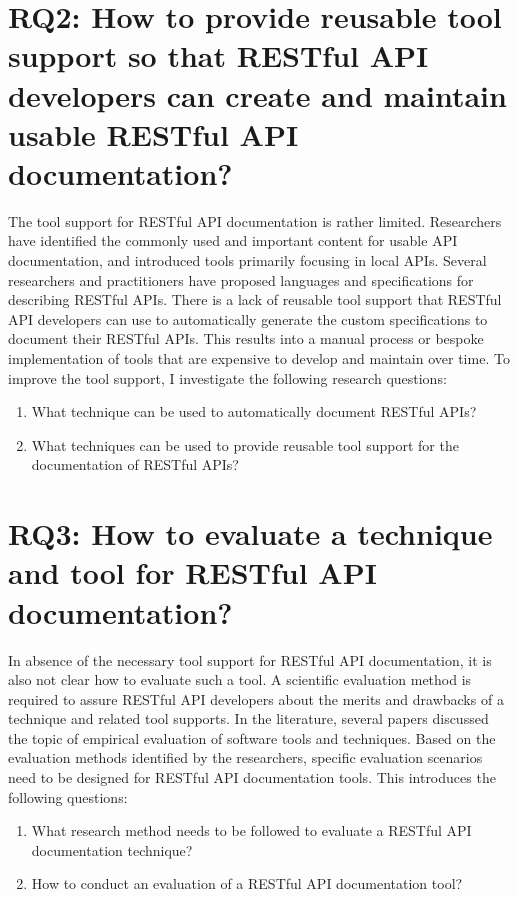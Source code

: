 \documentclass[11pt,oneside]{book}
\begin{document}
\section{RQ2: How to provide reusable tool support so that RESTful API developers can create and maintain usable RESTful API documentation?
} %

The tool support for RESTful API documentation is rather limited. Researchers have identified the commonly used and important content for usable API documentation, and introduced tools primarily focusing in local APIs. Several researchers and practitioners have proposed languages and specifications for describing RESTful APIs. There is a lack of reusable tool support that RESTful API developers can use to automatically generate the custom specifications to document their RESTful APIs. This results into a manual process or bespoke implementation of tools that are expensive to develop and maintain over time. To improve the tool support, I investigate the following research questions:

\begin{enumerate}
  \item What technique can be used to automatically document RESTful APIs?
  \item What techniques can be used to provide reusable tool support for the documentation of RESTful APIs?
\end{enumerate}

\section{RQ3: How to evaluate a technique and tool for RESTful API documentation?}

In absence of the necessary tool support for RESTful API documentation, it is also not clear how to evaluate such a tool. A scientific evaluation method is required to assure RESTful API developers about the merits and drawbacks of a technique and related tool supports. In the literature, several papers discussed the topic of empirical evaluation of software tools and techniques. Based on the evaluation methods identified by the researchers, specific evaluation scenarios need to be designed for RESTful API documentation tools. This introduces the following questions:

\begin{enumerate}
\item What research method needs to be followed to evaluate a RESTful API
documentation technique?
\item How to conduct an evaluation of a RESTful API documentation tool?
\end{enumerate}
\end{document}
